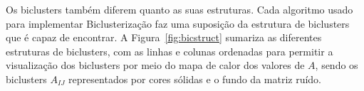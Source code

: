 \documentclass[
    12pt,                %
    oneside,            %
    a4paper,            %
    english,            %
    brazil                %
    ]{abntex2ppgsi}
\begin{document}
Os biclusters também diferem quanto as suas estruturas. Cada algoritmo usado para implementar Biclusterização faz uma suposição da estrutura de biclusters que é capaz de encontrar.
A Figura~\ref{fig:bicstruct} sumariza as diferentes estruturas de biclusters, com as linhas e colunas ordenadas para permitir a visualização dos biclusters por meio do mapa de calor dos valores de $A$, sendo os biclusters $A_{IJ}$ representados por cores sólidas e o fundo da matriz ruído.
                                    

\end{document}

